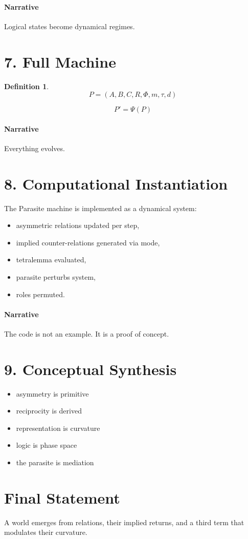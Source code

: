 \documentclass[11pt]{article}
\newtheorem{definition}{Definition}
\begin{document}
\paragraph{Narrative}
Logical states become dynamical regimes.

\section{7. Full Machine}

\begin{definition}
\[
P = (A,B,C,R,\Phi,m,\tau,d)
\]
\end{definition}

\[
P' = \Psi(P)
\]

\paragraph{Narrative}
Everything evolves.

\section{8. Computational Instantiation}

The Parasite machine is implemented as a dynamical system:
\begin{itemize}
\item asymmetric relations updated per step,
\item implied counter-relations generated via mode,
\item tetralemma evaluated,
\item parasite perturbs system,
\item roles permuted.
\end{itemize}

\paragraph{Narrative}
The code is not an example. It is a proof of concept.

\section{9. Conceptual Synthesis}

\begin{itemize}
\item asymmetry is primitive
\item reciprocity is derived
\item representation is curvature
\item logic is phase space
\item the parasite is mediation
\end{itemize}

\section*{Final Statement}

A world emerges from relations, their implied returns, and a third term that modulates their curvature.
\end{document}
